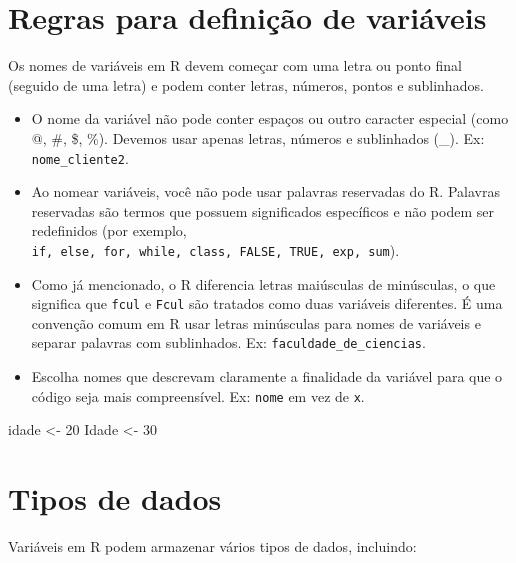 \documentclass[
]{book}
\newenvironment{Shaded}{\begin{snugshade}}{\end{snugshade}}
\newcommand{\DecValTok}[1]{\textcolor[rgb]{0.00,0.00,0.81}{#1}}
\newcommand{\NormalTok}[1]{#1}
\newcommand{\OtherTok}[1]{\textcolor[rgb]{0.56,0.35,0.01}{#1}}
\begin{document}
\section{Regras para definição de variáveis}\label{regras-para-definiuxe7uxe3o-de-variuxe1veis}

Os nomes de variáveis em R devem começar com uma letra ou ponto final (seguido de uma letra) e podem conter letras, números, pontos e sublinhados.

\begin{itemize}
\item
  O nome da variável não pode conter espaços ou outro caracter especial (como @, \#, \$, \%). Devemos usar apenas letras, números e sublinhados (\_). Ex: \texttt{nome\_cliente2}.
\item
  Ao nomear variáveis, você não pode usar palavras reservadas do R. Palavras reservadas são termos que possuem significados específicos e não podem ser redefinidos (por exemplo, \texttt{if,\ else,\ for,\ while,\ class,\ FALSE,\ TRUE,\ exp,\ sum}).
\item
  Como já mencionado, o R diferencia letras maiúsculas de minúsculas, o que significa que \texttt{fcul} e \texttt{Fcul} são tratados como duas variáveis diferentes. É uma convenção comum em R usar letras minúsculas para nomes de variáveis e separar palavras com sublinhados. Ex: \texttt{faculdade\_de\_ciencias}.
\item
  Escolha nomes que descrevam claramente a finalidade da variável para que o código seja mais compreensível. Ex: \texttt{nome} em vez de \texttt{x}.
\end{itemize}

\begin{Shaded}
\begin{Highlighting}[]
\NormalTok{idade }\OtherTok{\textless{}{-}} \DecValTok{20}
\NormalTok{Idade }\OtherTok{\textless{}{-}} \DecValTok{30}
\end{Highlighting}
\end{Shaded}

\section{Tipos de dados}\label{tipos-de-dados}

Variáveis em R podem armazenar vários tipos de dados, incluindo:
\end{document}
